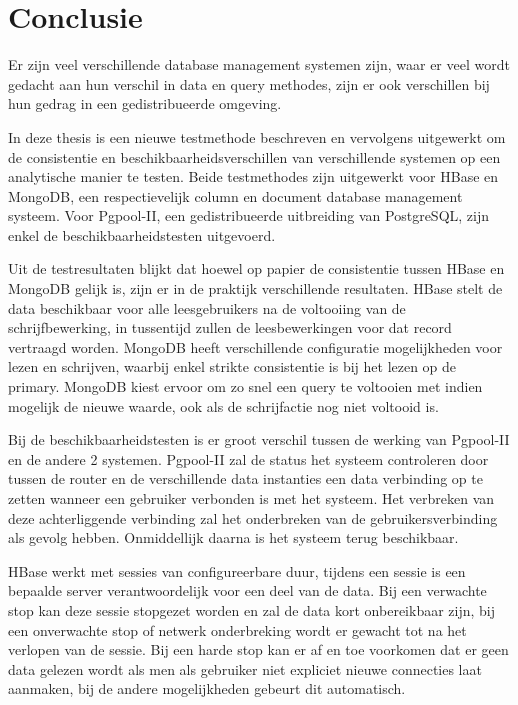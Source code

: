 \chapter{Conclusie}
Er zijn veel verschillende database management systemen zijn, waar er veel wordt gedacht aan hun verschil in data en query methodes, zijn er ook verschillen bij hun gedrag in een gedistribueerde omgeving.

In deze thesis is een nieuwe testmethode beschreven en vervolgens uitgewerkt om de consistentie en beschikbaarheidsverschillen van verschillende systemen op een analytische manier te testen. Beide testmethodes zijn uitgewerkt voor HBase en MongoDB, een respectievelijk column en document database management systeem. Voor Pgpool-II, een gedistribueerde uitbreiding van PostgreSQL, zijn enkel de beschikbaarheidstesten uitgevoerd. 

Uit de testresultaten blijkt dat hoewel op papier de consistentie tussen HBase en MongoDB gelijk is, zijn er in de praktijk verschillende resultaten. HBase stelt de data beschikbaar voor alle leesgebruikers na de voltooiing van de schrijfbewerking, in tussentijd zullen de leesbewerkingen voor dat record vertraagd worden. MongoDB heeft verschillende configuratie mogelijkheden voor lezen en schrijven, waarbij enkel strikte consistentie is bij het lezen op de primary. MongoDB kiest ervoor om zo snel een query te voltooien met indien mogelijk de nieuwe waarde, ook als de schrijfactie nog niet voltooid is. 

Bij de beschikbaarheidstesten is er groot verschil tussen de werking van Pgpool-II en de andere 2 systemen. Pgpool-II zal de status het systeem controleren door tussen de router en de verschillende data instanties een data verbinding op te zetten wanneer een gebruiker verbonden is met het systeem. Het verbreken van deze achterliggende verbinding zal het onderbreken van de gebruikersverbinding als gevolg hebben. Onmiddellijk daarna is het systeem terug beschikbaar. 

HBase werkt met sessies van configureerbare duur, tijdens een sessie is een bepaalde server verantwoordelijk voor een deel van de data. Bij een verwachte stop kan deze sessie stopgezet worden en zal de data kort onbereikbaar zijn, bij een onverwachte stop of netwerk onderbreking wordt er gewacht tot na het verlopen van de sessie. Bij een harde stop kan er af en toe voorkomen dat er geen data gelezen wordt als men als gebruiker niet expliciet nieuwe connecties laat aanmaken, bij de andere mogelijkheden gebeurt dit automatisch. 

